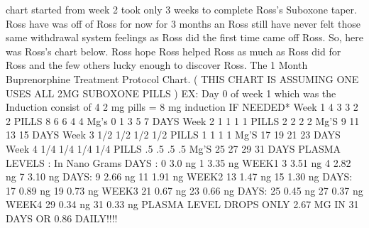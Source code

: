 \documentclass[12pt]{book}
\begin{document}
chart started from week 2 took only 3 weeks to complete Ross's Suboxone taper. Ross have was off of Ross for now for 3 months an Ross still have never felt those same withdrawal system feelings as Ross did the first time came off Ross. So, here was Ross's chart below. Ross hope Ross helped Ross as much as Ross did for Ross and the few others lucky enough to discover Ross. The 1 Month Buprenorphine Treatment Protocol Chart. ( THIS CHART IS ASSUMING ONE USES ALL 2MG SUBOXONE PILLS ) EX: Day 0 of week 1 which was the Induction consist of 4  2 mg pills = 8 mg induction IF NEEDED* Week 1 4 3 3 2 2 PILLS 8 6 6 4 4 Mg's 0 1 3 5 7 DAYS Week 2 1 1 1 1 PILLS 2 2 2 2 Mg'S 9 11 13 15 DAYS Week 3 1/2 1/2 1/2 1/2 PILLS 1 1 1 1 Mg'S 17 19 21 23 DAYS Week 4 1/4 1/4 1/4 1/4 PILLS .5 .5 .5 .5 Mg'S 25 27 29 31 DAYS PLASMA LEVELS : In Nano Grams DAYS : 0 3.0 ng 1 3.35 ng WEEK1 3 3.51 ng 4 2.82 ng 7 3.10 ng DAYS: 9 2.66 ng 11 1.91 ng WEEK2 13 1.47 ng 15 1.30 ng DAYS: 17 0.89 ng 19 0.73 ng WEEK3 21 0.67 ng 23 0.66 ng DAYS: 25 0.45 ng 27 0.37 ng WEEK4 29 0.34 ng 31 0.33 ng PLASMA LEVEL DROPS ONLY 2.67 MG IN 31 DAYS OR 0.86 DAILY!!!!
\end{document}
